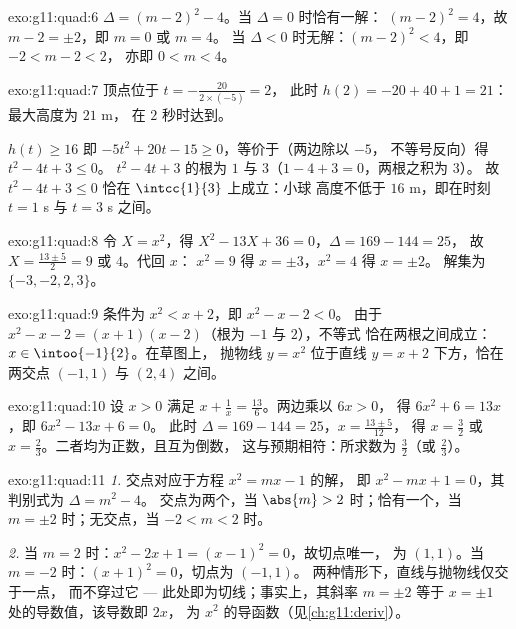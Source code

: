 \begin{solution}{exo:g11:quad:6}
$\Delta = (m-2)^2 - 4$。当 $\Delta = 0$ 时恰有一解：
$(m-2)^2 = 4$，故 $m - 2 = \pm 2$，即 $m = 0$ 或 $m = 4$。
当 $\Delta < 0$ 时无解：$(m-2)^2 < 4$，即 $-2 < m - 2 < 2$，
亦即 $0 < m < 4$。
\end{solution}

\begin{solution}{exo:g11:quad:7}
顶点位于 $t = -\frac{20}{2 \times (-5)} = 2$，
此时 $h(2) = -20 + 40 + 1 = 21$：最大高度为 $21$ m，
在 $2$ 秒时达到。

$h(t) \geq 16$ 即 $-5t^2 + 20t - 15 \geq 0$，等价于（两边除以 $-5$，
不等号反向）得 $t^2 - 4t + 3 \leq 0$。
$t^2-4t+3$ 的根为 $1$ 与 $3$（$1 - 4 + 3 = 0$，两根之积为 $3$）。
故 $t^2 - 4t + 3 \leq 0$ 恰在 $\intcc{1}{3}$ 上成立：小球
高度不低于 $16$ m，即在时刻 $t = 1$ s 与 $t = 3$ s 之间。
\end{solution}

\begin{solution}{exo:g11:quad:8}
令 $X = x^2$，得 $X^2 - 13X + 36 = 0$，$\Delta = 169 - 144 = 25$，
故 $X = \frac{13 \pm 5}{2} = 9$ 或 $4$。代回 $x$：
$x^2 = 9$ 得 $x = \pm 3$，$x^2 = 4$ 得 $x = \pm 2$。
解集为 $\{-3, -2, 2, 3\}$。
\end{solution}

\begin{solution}{exo:g11:quad:9}
条件为 $x^2 < x + 2$，即 $x^2 - x - 2 < 0$。
由于 $x^2 - x - 2 = (x+1)(x-2)$（根为 $-1$ 与 $2$），不等式
恰在两根之间成立：$x \in \intoo{-1}{2}$。在草图上，
抛物线 $y = x^2$ 位于直线 $y = x+2$ 下方，恰在
两交点 $(-1, 1)$ 与 $(2, 4)$ 之间。
\end{solution}

\begin{solution}{exo:g11:quad:10}
设 $x > 0$ 满足 $x + \frac1x = \frac{13}{6}$。两边乘以 $6x > 0$，
得 $6x^2 + 6 = 13x$，即 $6x^2 - 13x + 6 = 0$。
此时 $\Delta = 169 - 144 = 25$，$x = \frac{13 \pm 5}{12}$，
得 $x = \frac32$ 或 $x = \frac23$。二者均为正数，且互为倒数，
这与预期相符：所求数为 $\frac32$（或 $\frac23$）。
\end{solution}

\begin{solution}{exo:g11:quad:11}
\emph{1.} 交点对应于方程 $x^2 = mx - 1$ 的解，
即 $x^2 - mx + 1 = 0$，其判别式为 $\Delta = m^2 - 4$。
交点为两个，当 $\abs{m} > 2$ 时；恰有一个，当 $m = \pm 2$ 时；无交点，当 $-2 < m < 2$ 时。

\emph{2.} 当 $m = 2$ 时：$x^2 - 2x + 1 = (x-1)^2 = 0$，故切点唯一，
为 $(1, 1)$。当 $m = -2$ 时：$(x+1)^2 = 0$，切点为 $(-1, 1)$。
两种情形下，直线与抛物线仅交于一点，
而不穿过它 --- 此处即为切线；事实上，其斜率 $m = \pm 2$
等于 $x = \pm 1$ 处的导数值，该导数即 $2x$，
为 $x^2$ 的导函数（见\cref{ch:g11:deriv}）。
\end{solution}

